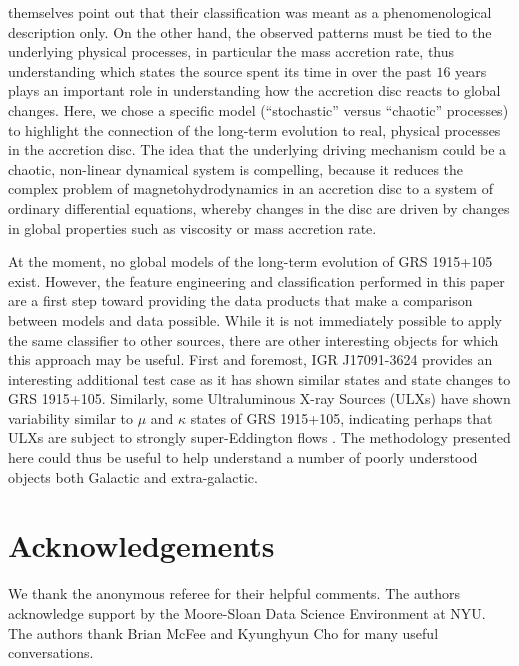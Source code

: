 \documentclass[fleqn,usenatbib]{mnras}
\begin{document}
\citet{belloni2000} themselves point out that their classification was meant as a phenomenological description only. On the other hand, the observed patterns 
must be tied to the underlying physical processes, in particular the mass accretion rate, thus understanding which states the source spent its time in over the 
past $16$ years plays an important role in understanding how the accretion disc reacts to global changes. Here, we chose a specific model (``stochastic'' versus 
``chaotic'' processes) to highlight the connection of the long-term evolution to real, physical processes in the accretion disc. The idea that the underlying driving 
mechanism could be a chaotic, non-linear dynamical system is compelling, because it reduces the complex problem of magnetohydrodynamics in an 
accretion disc to a system of ordinary differential equations, whereby changes in the disc are driven by changes in global properties such as viscosity or mass 
accretion rate. 

At the moment, no global models of the long-term evolution of GRS 1915+105 exist. However, the feature engineering and classification performed 
in this paper are a first step toward providing the data products that make a comparison between models and data possible. While it is not immediately possible to 
apply the same classifier to other sources, there are other interesting objects for which this approach may be useful. First and foremost, IGR J17091-3624 provides an 
interesting additional test case as it has shown similar states and state changes to GRS 1915+105. Similarly, some Ultraluminous X-ray Sources (ULXs) have shown variability 
similar to $\mu$ and $\kappa$ states of GRS 1915+105, indicating perhaps that ULXs are subject to strongly super-Eddington flows \citep{middleton2011}. 
The methodology presented here could thus be useful to help understand a number of poorly understood objects both Galactic and extra-galactic. 

\section*{Acknowledgements}

We thank the anonymous referee for their helpful comments.
The authors acknowledge support by the Moore-Sloan Data Science Environment at NYU. The authors thank Brian McFee and Kyunghyun Cho for many useful conversations.









\bsp	%
\label{lastpage}
\end{document}
